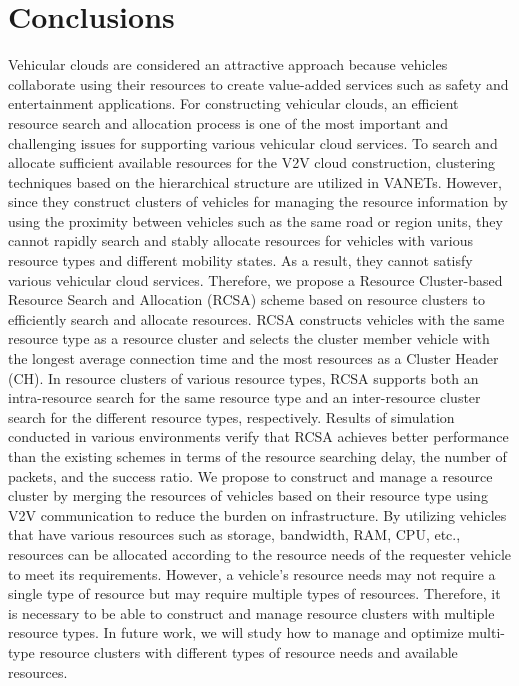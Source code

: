 \documentclass[sensors,article,accept,moreauthors,pdftex]{Definitions/mdpi}
\begin{document}
\section{Conclusions} \label{sec.c}
Vehicular clouds are considered an attractive approach because vehicles collaborate using their resources to create value-added services such as safety and entertainment applications. 
For constructing vehicular clouds, an efficient resource search and allocation process is one of the most important and challenging issues for supporting various vehicular cloud services. To search and allocate sufficient available resources for the V2V cloud construction, clustering techniques based on the hierarchical structure are utilized in VANETs.
However, since they construct clusters of vehicles for managing the resource information by using the proximity between vehicles such as the same road or region units, they cannot rapidly search and stably allocate resources for vehicles with various resource types and different mobility states. As a result, they cannot satisfy various vehicular cloud services. Therefore, we propose a Resource Cluster-based Resource Search and Allocation (RCSA) scheme based on resource clusters to efficiently search and allocate resources. RCSA constructs vehicles with the same resource type as a resource cluster and selects the cluster member vehicle with the longest average connection time and the most resources as a Cluster Header (CH). In resource clusters of various resource types, RCSA supports both an intra-resource search for the same resource type and an inter-resource cluster search for the different resource types, respectively.
Results of simulation conducted in various environments verify that RCSA achieves better performance than the existing schemes in terms of the resource searching delay, the number of packets, and the success ratio. We propose to construct and manage a resource cluster by merging the resources of vehicles based on their resource type using V2V communication to reduce the burden on infrastructure. By utilizing vehicles that have various resources such as storage, bandwidth, RAM, CPU, etc., resources can be allocated according to the resource needs of the requester vehicle to meet its requirements. However, a vehicle's resource needs may not require a single type of resource but may require multiple types of resources. Therefore, it is necessary to be able to construct and manage resource clusters with multiple resource types. In future work, we will study how to manage and optimize multi-type resource clusters with different types of resource needs and available resources.
\end{document}
